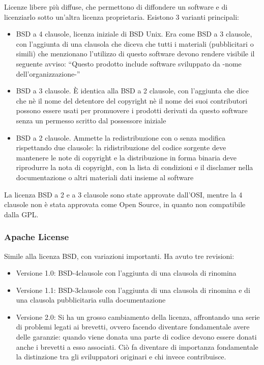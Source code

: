 Licenze libere pi\`u diffuse, che permettono di diffondere un software e di licenziarlo sotto un'altra licenza proprietaria. Esistono 3 varianti principali:
\begin{itemize}
\item BSD a 4 clausole, licenza iniziale di BSD Unix. Era come BSD a 3 clausole, con l'aggiunta di una clausola che diceva che tutti i materiali (pubblicitari o simili) che menzionano l'utilizzo di questo software devono rendere visibile il seguente avviso: ``Questo prodotto include software sviluppato da -nome dell'organizzazione-''
\item BSD a 3 clausole. \`E identica alla BSD a 2 clausole, con l'aggiunta che dice che n\`e il nome del detentore del copyright n\`e il nome dei suoi contributori possono essere usati per promuovere i prodotti derivati da questo software senza un permesso scritto dal possessore iniziale
\item BSD a 2 clausole. Ammette la redistribuzione con o senza modifica rispettando due clausole: la ridistribuzione del codice sorgente deve mantenere le note di copyright e la distribuzione in forma binaria deve riprodurre la nota di copyright, con la lista di condizioni e il disclamer nella documentazione o altri materiali dati insieme al software
\end{itemize}

La licenza BSD a 2 e a 3 clausole sono state approvate dall'OSI, mentre la 4 clausole non \`e stata approvata come Open Source, in quanto non compatibile dalla GPL.

\newpage

\subsubsection{Apache License}

Simile alla licenza BSD, con variazioni importanti. Ha avuto tre revisioni:
\begin{itemize}

\item Versione 1.0: BSD-4clausole con l'aggiunta di una clausola di rinomina
\item Versione 1.1: BSD-3clausole con l'aggiunta di una clausola di rinomina e di una clausola pubblicitaria sulla documentazione
\item Versione 2.0: Si ha un grosso cambiamento della licenza, affrontando una serie di problemi legati ai brevetti, ovvero facendo diventare fondamentale avere delle garanzie: quando viene donata una parte di codice devono essere donati anche i brevetti a esso associati. Ci\`o fa diventare di importanza fondamentale la distinzione tra gli sviluppatori originari e chi invece contribuisce.
\end{itemize}


